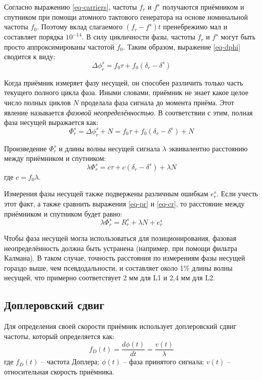 Согласно выражению \eqref{eq-carriers}, частоты $f_r$ и $f^s$ получаются приёмником и спутником при помощи атомного тактового генератора на основе номинальной частоты $f_0$.
Поэтому вклад слагаемого $(f_r-f^s)t$ пренебрежимо мал и составляет порядка $10^{-14}$.  
В силу цикличности фазы, частоты $f_r$ и $f^s$ могут быть просто аппроксимированы частотой $f_0$.
Таким образом, выражение \eqref{eq-dphi} сводится к виду:
\begin{equation}
\Delta \phi_r^s=f_0\tau+f_0(\delta_r-\delta^s)    
\end{equation}

Когда приёмник измеряет фазу несущей, он способен различить только часть текущего полного цикла фаза.
Иными словами, приёмник не знает какое целое число полных циклов $N$ проделала фаза сигнала до момента приёма.
Этот явление называется \textit{фазовой неопределённостью}.
В соответствии с этим, полная фаза несущей выражается как:
\begin{equation}
\Phi_r^s=\Delta \phi_r^s+N=f_0\tau+f_0(\delta_r-\delta^s)+N    
\end{equation}

Произведение $\Phi_r^s$ и длины волны несущей сигнала $\lambda$ эквивалентно расстоянию между приёмником и спутником:
\begin{equation}
\label{eq-cr}
\lambda\Phi_r^s=c\tau+c(\delta_r-\delta^s)+\lambda N    
\end{equation}
где
$c=f_0\lambda$.

Измерения фазы несущей также подвержены различным ошибкам $e_r^s$.
Если учесть этот факт, а также сравнить выражения \eqref{eq-pr} и \eqref{eq-cr}, то расстояние между приёмником и спутником будет равно:
\begin{equation}
\label{eq-cr2}
\lambda\Phi_r^s=R_r^s+\lambda N+e_r^s
\end{equation}

Чтобы фаза несущей могла использоваться для позиционирования, фазовая неопределённость должна быть устранена (например, при помощи фильтра Калмана).
В таком случае, точность расстояния по измерениям фазы несущей гораздо выше, чем псевдодальности, и составляет около 1\% длины волны несущей, что примерно соответствует 2 мм для L1 и 2,4 мм для L2.

\subsection*{\textbf{Доплеровский сдвиг}}

Для определения своей скорости приёмник использует доплеровский сдвиг частоты, который определяется как:
\begin{equation}
\label{eq-dopler}
f_D(t)=\frac{d\phi(t)}{dt}=\frac{v(t)}{\lambda}    
\end{equation} 
где 
$f_D(t)$ -- частота Доплера;
$\phi(t)$ -- фаза принятого сигнала;
$v(t)$ -- относительная скорость приёмника.

